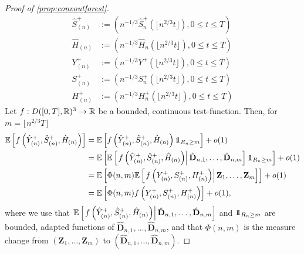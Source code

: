 \begin{proof}[Proof of \cref{prop:convoutforest}]
\begin{align*}
    \hat{S}^{+}_{(n)}&:=\left(n^{-1/3}\hat{S}^{+}_n\left(\lfloor n^{2/3} t \rfloor\right),0\leq t \leq T\right)\\
    \hat{H}_{(n)}&:=\left(n^{-1/3}\hat{H}_n\left(\lfloor n^{2/3} t \rfloor\right),0\leq t \leq T\right)\\
    {Y}^+_{(n)}&:=\left(n^{-1/3}{Y}^+\left(\lfloor n^{2/3} t \rfloor\right),0\leq t \leq T\right)\\
     {S}^{+}_{(n)}&:=\left(n^{-1/3}{S}^{+}_n\left(\lfloor n^{2/3} t \rfloor\right),0\leq t \leq T\right)\\
    {H}^+_{(n)}&:=\left(n^{-1/3}{H}^+_n\left(\lfloor n^{2/3} t \rfloor\right),0\leq t \leq T\right)
\end{align*}
Let $f:D([0,T],{\mathbb R})^3\to {\mathbb R}$ be a bounded, continuous test-function. Then, for $m=\lfloor n^{2/3}T\rfloor$
\begin{align*}\E\left[f\left(\hat{Y}^+_{(n)}, \hat{S}^+_{(n)},  \hat{H}_{(n)}\right) \right]&= \E\left[f\left(\hat{Y}^+_{(n)}, \hat{S}^+_{(n)},  \hat{H}_{(n)}\right) \one_{R_n\geq m} \right]+o(1)\\
&=\E\left[ \E\left[\left. f\left(\hat{Y}^+_{(n)},\hat{S}^+_{(n)},  \hat{H}_{(n)}\right)\right|\hat{\mathbf{D}}_{n,1},\dots, \hat{\mathbf{D}}_{n,m} \right]\one_{R_n\geq m} \right]+o(1)
 \\&=\E\left[ \Phi(n,m)\E\left[\left.f\left(Y^+_{(n)}, S^+_{(n)},  H^+_{(n)}\right)\right| \mathbf{Z}_1,\dots, \mathbf{Z}_m\right]\right]+o(1)\\&=\E\left[ \Phi(n,m)f\left(Y^+_{(n)},S^+_{(n)},  H^+_{(n)}\right)\right]+o(1),
\end{align*}
where we use that ${\mathbb E}\left[\left. f\left(\hat{Y}^+_{(n)},\hat{S}^+_{(n)},  \hat{H}_{(n)}\right)\right| \hat{\mathbf{D}}_{n,1},\dots, \hat{\mathbf{D}}_{n,m}\right]$ and $\one_{R_n\geq m}$ are bounded, adapted functions of $\hat{\mathbf{D}}_{n,1},\dots, \hat{\mathbf{D}}_{n,m}$, and that $\Phi(n,m)$ is the measure change from  $({\mathbf{Z}}_{1},\dots, {\mathbf{Z}}_{m})$ to $(\hat{\mathbf{D}}_{n,1},\dots, \hat{\mathbf{D}}_{n,m})$.

\end{proof}
